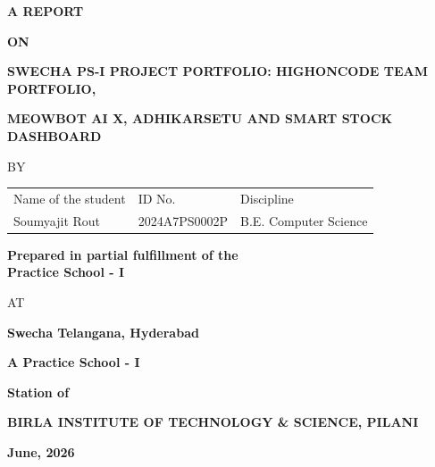 \documentclass{book}
\begin{document}


\large

\thispagestyle{empty}
\centerline{\bf A REPORT}
\vspace*{0.3cm}
\centerline{\bf ON}
\vspace*{0.3cm}
\centerline{\bf SWECHA PS-I PROJECT PORTFOLIO: HIGHONCODE TEAM PORTFOLIO,}
\centerline{\bf MEOWBOT AI X, ADHIKARSETU AND SMART STOCK DASHBOARD}
\vspace*{2cm}

\centerline{BY}
\vspace*{1cm}

\begin{center}
  \begin{tabular}{lll}
    Name of the student & \hspace*{1.5cm} ID No. & \hspace*{1.5cm} Discipline \\
    Soumyajit Rout & \hspace*{1.5cm} 2024A7PS0002P & \hspace*{1.5cm} B.E. Computer Science \\
  \end{tabular}
\end{center}

\vspace*{2cm}
\begin{center}
  {\bf Prepared in partial fulfillment of the \\
  Practice School - I}
\end{center}

\vspace*{0.5cm}
\centerline{AT}
\vspace*{1cm}
\centerline{\bf Swecha Telangana, Hyderabad}
\vspace{0.2cm}
\centerline{\bf A Practice School - I}
\vspace{0.2cm}
\centerline{\bf Station of}
\vspace{0.5cm}
\begin{figure}[ht]
\epsfxsize=1.0in
\centerline{}
\end{figure}

\centerline{\bf BIRLA INSTITUTE OF TECHNOLOGY \& SCIENCE, PILANI}
\vspace*{0.5cm}
\centerline{\bf June, 2026}
\newpage
\end{document}
